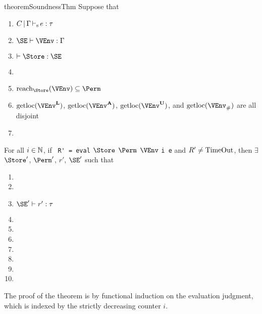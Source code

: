 \begin{restatable}{theorem}{SoundnessThm}\label{thm:soundness}
  Suppose that
  \begin{enumerate}[({A}1)]
  \item $C \operatorname{|} \Gamma \operatorname{\vdash_s} e : \tau$
  \item $\SE \vdash \VEnv : \E$
  \item $\vdash \Store : \SE$
  \item\label{item:11} \assumeWellformed{}
  \item\label{item:12} $\Reach\Store\VEnv \subseteq \Perm$
  \item $\Rawloc{\Active\VEnv}$,
    $\Rawloc{\MutableBorrows\VEnv}$,
    $\Rawloc{\ImmutableBorrows\VEnv}$, and
    $\Rawloc{\Suspended\VEnv}$ are all disjoint
  \item\label{item:15} \assumeIncoming{}{}
  \end{enumerate}
  For all $i\in\mathbb{N}$, if
  \ \lstinline[style=rule]{R' = eval} $\Store$ $\Perm$ $\VEnv$ \lstinline[style=rule]{i e}
  and $R'\ne \operatorname{TimeOut}$,
  then
  $\exists$ $\Store'$, $\Perm'$, $r'$, $\SE'$ such that
  \begin{enumerate}[({R}1)]
  \item {}
  \item {}
  \item $\SE' \vdash r' : \tau$
  \item {}
  \item {}
  \item {}
  \item {}
  \item {}
  \item {}
  \item {}
  \end{enumerate}
\end{restatable}

The proof of the
theorem is by functional induction on the evaluation judgment, which
is indexed by the strictly decreasing counter $i$.

